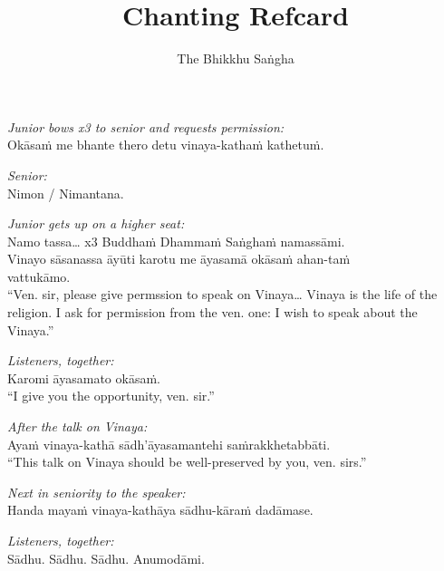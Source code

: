 \documentclass[10pt,oneside]{memoir}
\title{Chanting Refcard}
\author{The Bhikkhu Saṅgha}
\begin{document}
\begin{hangparas}{1em}{1}

\emph{Junior bows x3 to senior and requests permission:}\\
Okāsaṁ me bhante thero detu vinaya-kathaṁ kathetuṁ.

\emph{Senior:}\\
Nimon / Nimantana.

\emph{Junior gets up on a higher seat:}\\
Namo tassa\ldots{} x3 Buddhaṁ Dhammaṁ Saṅghaṁ namassāmi.\\
Vinayo sāsanassa āyūti karotu me āyasamā okāsaṁ ahan-taṁ\\ vattukāmo.\\[5pt]
``Ven. sir, please give permssion to speak on Vinaya\ldots{} Vinaya is the
life of the religion. I ask for permission from the ven. one: I wish
to speak about the Vinaya.''

\emph{Listeners, together:}\\
Karomi āyasamato okāsaṁ.\\[5pt]
``I give you the opportunity, ven. sir.''

\emph{After the talk on Vinaya:}\\
Ayaṁ vinaya-kathā sādh'āyasamantehi saṁrakkhetabbāti.\\[5pt]
``This talk on Vinaya should be well-preserved by you, ven. sirs.''

\emph{Next in seniority to the speaker:}\\
Handa mayaṁ vinaya-kathāya sādhu-kāraṁ dadāmase.

\emph{Listeners, together:}\\
Sādhu. Sādhu. Sādhu. Anumodāmi.

\end{hangparas}
\end{document}

